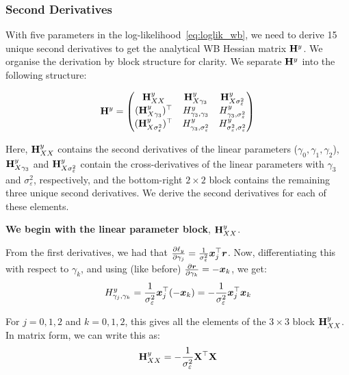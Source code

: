 \subsubsection{Second Derivatives}

With five parameters in the log-likelihood~\eqref{eq:loglik_wb}, we need to derive 15 unique second derivatives to get the analytical WB Hessian matrix $\mathbf{H}^y$. We organise the derivation by block structure for clarity. We separate $\mathbf{H}^y$ into the following structure:

\begin{equation}
\label{eq:hessian_block}
    \mathbf{H}^y = \begin{pmatrix}
        \mathbf{H}^y_{XX} & \mathbf{H}^y_{X\gamma_3} & \mathbf{H}^y_{X\sigma_\varepsilon^2} \\
        (\mathbf{H}^y_{X\gamma_3})^\top & H^y_{\gamma_3,\gamma_3} & H^y_{\gamma_3,\sigma_\varepsilon^2} \\
        (\mathbf{H}^y_{X\sigma_\varepsilon^2})^\top & H^y_{\gamma_3,\sigma_\varepsilon^2} & H^y_{\sigma_\varepsilon^2,\sigma_\varepsilon^2}
    \end{pmatrix}
\end{equation}

Here, $\mathbf{H}^y_{XX}$ contains the second derivatives of the linear parameters ($\gamma_0, \gamma_1, \gamma_2$), $\mathbf{H}^y_{X\gamma_3}$ and $\mathbf{H}^y_{X\sigma_\varepsilon^2}$ contain the cross-derivatives of the linear parameters with $\gamma_3$ and $\sigma_\varepsilon^2$, respectively, and the bottom-right $2 \times 2$ block contains the remaining three unique second derivatives. We derive the second derivatives for each of these elements.

\textbf{We begin with the linear parameter block}, $\mathbf{H}^y_{XX}$.

From the first derivatives, we had that $\frac{\partial \ell_y}{\partial \gamma_j} = \frac{1}{\sigma_\varepsilon^2}\bm{x}_j^\top\bm{r}$. Now, differentiating this with respect to $\gamma_k$, and using (like before) $\frac{\partial \bm{r}}{\partial \gamma_k} = -\bm{x}_k$, we get:
\begin{equation}
    H^y_{\gamma_j,\gamma_k} = \frac{1}{\sigma_\varepsilon^2}\bm{x}_j^\top(-\bm{x}_k) = -\frac{1}{\sigma_\varepsilon^2}\bm{x}_j^\top\bm{x}_k
\end{equation}

For $j = 0, 1, 2$ and $k = 0, 1, 2$, this gives all the elements of the $3 \times 3$ block $\mathbf{H}^y_{XX}$. In matrix form, we can write this as:
\begin{equation}
    \mathbf{H}^y_{XX} = -\frac{1}{\sigma_\varepsilon^2}\mathbf{X}^\top\mathbf{X}
\end{equation}

